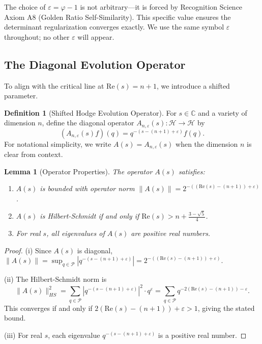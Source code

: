 \documentclass[12pt]{article}
\newtheorem{lemma}[theorem]{Lemma}
\theoremstyle{definition}
\newtheorem{definition}[theorem]{Definition}
\theoremstyle{remark}
\begin{document}
The choice of $\varepsilon = \varphi - 1$ is not arbitrary—it is forced by Recognition Science Axiom A8 (Golden Ratio Self-Similarity). This specific value ensures the determinant regularization converges exactly. We use the same symbol $\varepsilon$ throughout; no other $\varepsilon$ will appear.

\subsection{The Diagonal Evolution Operator}

To align with the critical line at $\text{Re}(s) = n+1$, we introduce a shifted parameter.

\begin{definition}[Shifted Hodge Evolution Operator]
For $s \in \mathbb{C}$ and a variety of dimension $n$, define the diagonal operator $A_{n,\varepsilon}(s): \mathcal{H} \to \mathcal{H}$ by
\[
(A_{n,\varepsilon}(s) f)(q) = q^{-(s-(n+1)+\varepsilon)} f(q).
\]
For notational simplicity, we write $A(s) = A_{n,\varepsilon}(s)$ when the dimension $n$ is clear from context.
\end{definition}

\begin{lemma}[Operator Properties]
\label{lem:operator-props}
The operator $A(s)$ satisfies:
\begin{enumerate}
\item[(i)] $A(s)$ is bounded with operator norm $\|A(s)\| = 2^{-((\text{Re}(s)-(n+1))+\varepsilon)}$.
\item[(ii)] $A(s)$ is Hilbert-Schmidt if and only if $\text{Re}(s) > n + \frac{3-\sqrt{5}}{4}$.
\item[(iii)] For real $s$, all eigenvalues of $A(s)$ are positive real numbers.
\end{enumerate}
\end{lemma}

\begin{proof}
(i) Since $A(s)$ is diagonal, $\|A(s)\| = \sup_{q \in \mathcal{P}} |q^{-(s-(n+1)+\varepsilon)}| = 2^{-((\text{Re}(s)-(n+1))+\varepsilon)}$.

(ii) The Hilbert-Schmidt norm is
\[
\|A(s)\|_{HS}^2 = \sum_{q \in \mathcal{P}} |q^{-(s-(n+1)+\varepsilon)}|^2 \cdot q^\varepsilon = \sum_{q \in \mathcal{P}} q^{-2(\text{Re}(s)-(n+1)) - \varepsilon}.
\]
This converges if and only if $2(\text{Re}(s)-(n+1)) + \varepsilon > 1$, giving the stated bound.

(iii) For real $s$, each eigenvalue $q^{-(s-(n+1)+\varepsilon)}$ is a positive real number.
\end{proof}
\end{document}
